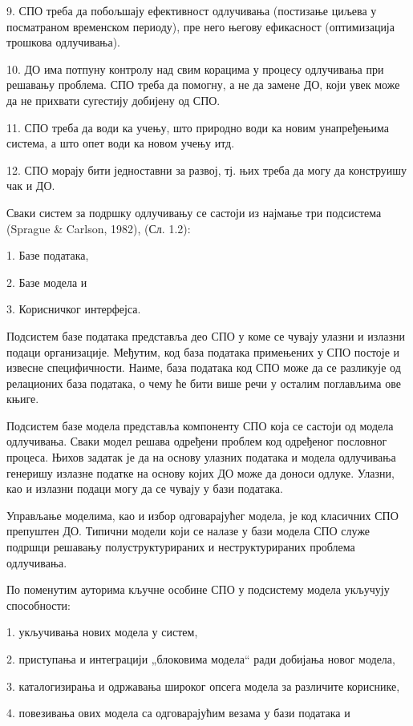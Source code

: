 9. СПО треба да побољшају ефективност одлучивања (постизање циљева у посматраном временском периоду), пре него његову ефикасност (оптимизација трошкова одлучивања).

10. ДО има потпуну контролу над свим корацима у процесу одлучивања при решавању проблема. СПО треба да помогну, а не да замене ДО, који увек може да не прихвати сугестију добијену од СПО.

11. СПО треба да води ка учењу, што природно води ка новим унапређењима система, а што опет води ка новом учењу итд.

12. СПО морају бити једноставни за развој, тј. њих треба да могу да конструишу чак и ДО.

Сваки систем за подршку одлучивању се састоји из најмање три подсистема (Sprague \& Carlson, 1982), (Сл. 1.2):

1. Базе података,

2. Базе модела и

3. Корисничког интерфејса.

Подсистем базе података представља део СПО у коме се чувају улазни и излазни подаци организације. Међутим, код база података примењених у СПО постоје и извесне специфичности. Наиме, база података код СПО може да се разликује од релационих база података, о чему ће бити више речи у осталим поглављима ове књиге.

Подсистем базе модела представља компоненту СПО која се састоји од модела одлучивања. Сваки модел решава одређени проблем код одређеног пословног процеса. Њихов задатак је да на основу улазних података и модела одлучивања генеришу излазне податке на основу којих ДО може да доноси одлуке. Улазни, као и излазни подаци могу да се чувају у бази података.

Управљање моделима, као и избор одговарајућег модела, је код класичних СПО препуштен ДО. Типични модели који се налазе у бази модела СПО служе подршци решавању полуструктурираних и неструктурираних проблема одлучивања.

По поменутим ауторима кључне особине СПО у подсистему модела укључују способности:

1. укључивања нових модела у систем,

2. приступања и интеграцији „блоковима модела“ ради добијања новог модела,

3. каталогизирања и одржавања широког опсега модела за различите кориснике,

4. повезивања ових модела са одговарајућим везама у бази података и

